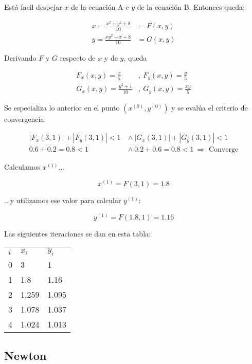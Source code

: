 \documentclass{article}
\begin{document}
Está facil despejar $x$ de la ecuación A e $y$ de la ecuación B. Entonces queda:

\begin{align*}
    x = \frac{x^2+y^2+8}{10} &= F(x,y) \\
    y = \frac{xy^2+x+8}{10} &= G(x,y)
\end{align*}

Derivando $F$ y $G$ respecto de $x$ y de $y$, queda

\begin{align*}
    F_x(x,y) = \frac{x}{5}&,\ F_y(x,y) = \frac{y}{5} \\
    G_x(x,y) = \frac{y^2+1}{10}&,\ G_y(x,y) = \frac{xy}{5}
\end{align*}

Se especializa lo anterior en el punto $(x^{(0)}, y^{(0)})$ y se evalúa el criterio de convergencia:

\begin{align*}
    |F_x(3,1)| + |F_y(3,1)| < 1\ &\land\ |G_x(3,1)| + |G_y(3,1)| < 1 \\
    0.6 + 0.2 = 0.8 < 1\ &\land\ 0.2 + 0.6 = 0.8 < 1\ \Longrightarrow\text{ Converge}
\end{align*}

Calculamos $x^{(1)}$...

\begin{equation*}
    x^{(1)} = F(3,1) = 1.8
\end{equation*}

...y utilizamos ese valor para calcular $y^{(1)}$:

\begin{equation*}
    y^{(1)} = F(1.8,1) = 1.16
\end{equation*}

Las siguientes iteraciones se dan en esta tabla:

\begin{table}[h]
\centering
\begin{tabular}{lll}
$i$ & $x_i$  & $y_i$  \\
0 & 3     & 1     \\
1 & 1.8   & 1.16  \\
2 & 1.259 & 1.095 \\
3 & 1.078 & 1.037 \\
4 & 1.024 & 1.013
\end{tabular}
\end{table}

\subsection{Newton}
\end{document}
